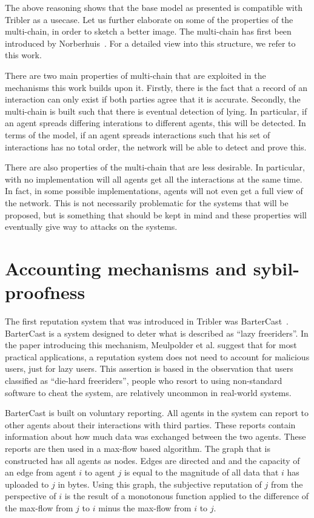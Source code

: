 \documentclass[a4paper,11pt]{book}
\theoremstyle{definition}
\begin{document}
The above reasoning shows that the base model as presented is compatible with Tribler as a usecase.
Let us further elaborate on some of the properties of the multi-chain, in order to sketch a better image.
The multi-chain has first been introduced by Norberhuis~\cite{norberhuis2015multichain}. For a detailed
view into this structure, we refer to this work.

There are two main properties of multi-chain that are exploited in the mechanisms this work builds upon it.
Firstly, there is the fact that a record of an interaction can only exist if both parties agree that it
is accurate. Secondly, the multi-chain is built such that there is eventual detection of lying. In particular,
if an agent spreads differing interations to different agents, this will be detected. In terms of the model,
if an agent spreads interactions such that his set of interactions has no total order, the network will
be able to detect and prove this. 

There are also properties of the multi-chain that are less desirable. In particular, with no implementation
will all agents get all the interactions at the same time. In fact, in some possible implementations, 
agents will not even get a full view of the network. This is not necessarily problematic for the systems
that will be proposed, but is something that should be kept in mind and these properties will eventually
give way to attacks on the systems. 


\chapter{Accounting mechanisms and sybil-proofness}
\label{chap:netflow}

The first reputation system that was introduced in Tribler was BarterCast~\cite{meulpolder2009bartercast}.
BarterCast is a system designed to deter what is described as ``lazy freeriders''.
In the paper introducing this mechanism, Meulpolder et al. suggest that for most practical applications, 
a reputation system does not
need to account for malicious users, just for lazy users. This assertion is based in the observation
that users classified as ``die-hard freeriders'', people who resort to using non-standard software to
cheat the system, are relatively uncommon in real-world systems. 

BarterCast is built on voluntary reporting. All agents in the system can report to other agents
about their interactions with third parties. These reports contain information about how much data
was exchanged between the two agents. These reports are then used in a max-flow based algorithm.
The graph that is constructed has all agents as nodes. Edges are directed and and the capacity
of an edge from agent $i$ to agent $j$ is equal to the magnitude of all data that $i$ has
uploaded to $j$ in bytes. Using this graph, the subjective reputation of $j$ from the perspective
of $i$ is the result of a monotonous function applied to the difference of the max-flow from $j$ to $i$
minus the max-flow from $i$ to $j$.
\end{document}
